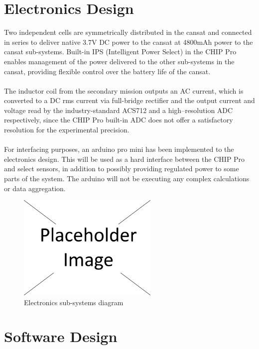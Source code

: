 \documentclass{report}
\begin{document}
	\section{Electronics Design}
		Two independent cells are symmetrically distributed in the cansat and
		connected in series to deliver native 3.7V DC power to the cansat at 
		4800mAh power to the cansat sub-systems.
		Built-in IPS (Intelligent Power Select) in the CHIP Pro enables management
		of the power delivered to the other sub-systems in the cansat, providing
		flexible control over the battery life of the cansat. 
		\\\\
		The inductor coil from the secondary mission outputs an AC current, which
		is converted to a DC rms current via full-bridge rectifier and the output
		current and voltage read by the industry-standard ACS712 and a 
		high--resolution ADC respectively, since the CHIP Pro built-in ADC 
		does not offer a satisfactory resolution for the experimental precision.
		\\\\
		{\color{blue}For interfacing purposes, an arduino pro mini has been
		implemented to the electronics design. This will be used as a hard interface
		between the CHIP Pro and select sensors, in addition to possibly providing
		regulated power to some parts of the system. The arduino will not be 
		executing any complex calculations or data aggregation.}
		
		\begin{figure}[H]
			\begin{center}
				\includegraphics[width=0.6\textwidth]{placeholder}
			\end{center}
			\vspace{-15pt}
			\caption{Electronics sub-systems diagram}
		\end{figure}


	\section{Software Design}
\end{document}
